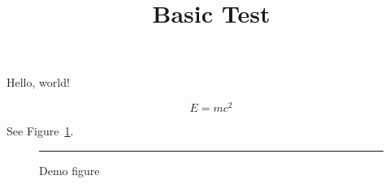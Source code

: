 \documentclass{article}
\begin{document}
\title{Basic Test}
\maketitle

Hello, world!

\begin{equation}
  E = mc^2
\end{equation}

See Figure~\ref{fig:demo}.

\begin{figure}[h]
  \centering
  \rule{1cm}{1cm}
  \caption{Demo figure}\label{fig:demo}
\end{figure}
\end{document}
